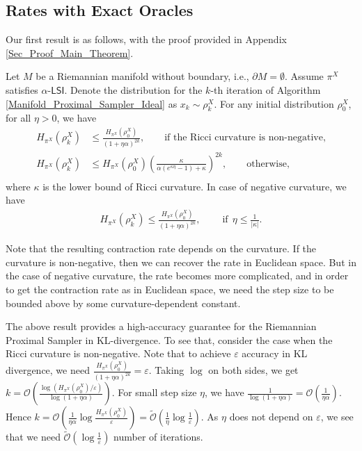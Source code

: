 \subsection{Rates with Exact Oracles}\label{Sec_Exact_oracle}
Our first result is as follows, with the proof provided in Appendix \ref{Sec_Proof_Main_Theorem}. %
\begin{theorem}\label{Main_Theorem}
    Let $M$ be a Riemannian manifold without boundary, i.e., $\partial M = \emptyset$. Assume $\pi^{X}$ satisfies $\alpha$-$\mathsf{LSI}$. 
    Denote the distribution for the $k$-th iteration of Algorithm \ref{Manifold_Proximal_Sampler_Ideal} as $x_{k} \sim \rho_{k}^{X} $.
    For any initial distribution $\rho_{0}^{X}$, for all $\eta > 0$, we have
    \begin{equation*}
        \begin{split}
            H_{\pi^{X}} (\rho_{k}^{X} ) &\le \frac{H_{\pi^{X}} (\rho_{0}^{X})}{(1 + \eta\alpha)^{2k} }, \qquad\text{if the Ricci curvature is non-negative,} \\
            H_{\pi^{X}} (\rho_{k}^{X} ) &\le H_{\pi^{X}} (\rho_{0}^{X}) \left(\frac{\kappa}{\alpha(e^{\kappa \eta} - 1) + \kappa}\right)^{2k}, \qquad\text{otherwise,} \\
        \end{split}
    \end{equation*}
    where $\kappa$ is the lower bound of Ricci curvature.
    In case of negative curvature, we have
    \begin{align*}
    H_{\pi^{X}} (\rho_{k}^{X} ) \le \frac{H_{\pi^{X}} (\rho_{0}^{X})}{(1 + \eta\alpha)^{2k} },\qquad~\text{if}~~\eta \le \frac{1}{|\kappa|}.
    \end{align*}
\end{theorem}

Note that the resulting contraction rate depends on the curvature. If the curvature is non-negative, then we can recover the rate in Euclidean space. But in the case of negative curvature, the rate becomes more complicated, and in order to get the contraction rate as in Euclidean space, we need the step size to be bounded above by some curvature-dependent constant. 

The above result provides a high-accuracy guarantee for the Riemannian Proximal Sampler in KL-divergence. To see that, consider the case when the Ricci curvature is non-negative. Note that to achieve $\varepsilon$ accuracy in KL divergence, we need $\frac{H_{\pi^{X}} (\rho_{0}^{X})}{(1 + \eta\alpha)^{2k} } = \varepsilon$. Taking $\log$ on both sides, we get 
    $k = \mathcal{O}(\frac{\log (H_{\pi^{X}} (\rho_{0}^{X})/\varepsilon)}{\log (1 + \eta\alpha)}) $.
    For small step size $\eta$, we have $\frac{1}{\log(1 + \eta \alpha)} = \mathcal{O}(\frac{1}{\eta \alpha})$. 
    Hence $k = \mathcal{O}(\frac{1}{\eta \alpha} \log \frac{H_{\pi^{X}} (\rho_{0}^{X})}{\varepsilon}) = \tilde{\mathcal{O}}(\frac{1}{\eta}\log \frac{1}{\varepsilon})$. As $\eta$ does not depend on $\varepsilon$, we see that we need $\tilde{\mathcal{O}}(\log \frac{1}{\varepsilon})$ number of iterations.



